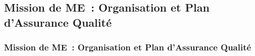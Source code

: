 \subsection{Mission de ME~: Organisation et Plan d'Assurance Qualité}
\begin{frame}
	\frametitle{Mission de ME~: Organisation et Plan d'Assurance Qualité}
\end{frame}
